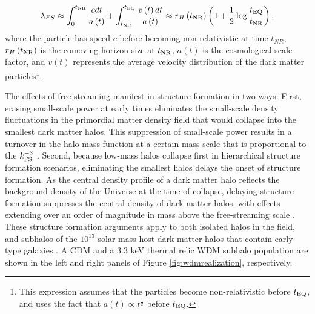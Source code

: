 \begin{equation}
\label{eqn:freestreaming}
\lambda_{FS} \approx \int_{0}^{t_{\rm{NR}}} \frac{c dt}{a\left(t\right)} +  \int_{t_{\rm{NR}}}^{t_{\rm{EQ}}} \frac{v\left(t\right) dt}{a\left(t\right)} \approx r_{H}\left(t_{\rm{NR}}\right) \left(1 +\frac{1}{2} \log \frac{t_{\rm{EQ}}}{t_{\rm{NR}}} \right),
\end{equation}
where the particle has speed $c$ before becoming non-relativistic at time $t_{NR}$, $r_H \left(t_{\rm{NR}}\right)$ is the comoving horizon size at $t_{\rm{NR}}$, $a\left(t\right)$ is the cosmological scale factor, and $v\left(t\right)$ represents the average velocity distribution of the dark matter particles\footnote{This expression assumes that the particles become non-relativistic before $t_{\rm{EQ}}$, and uses the fact that $a\left(t\right)\propto t^{\frac{1}{2}}$ before $t_{\rm{EQ}}$.}. 

The effects of free-streaming manifest in structure formation in two ways: First, erasing small-scale power at early times eliminates the small-scale density fluctuations in the primordial matter density field that would collapse into the smallest dark matter halos. This suppression of small-scale power results in a turnover in the halo mass function at a certain mass scale that is proportional to the $k_{\rm{FS}}^{-3}$ \cite{AvilaReese++01,Schneider++12,Lovell++14}. Second, because low-mass halos collapse first in hierarchical structure formation scenarios, eliminating the smallest halos delays the onset of structure formation. As the central density profile of a dark matter halo reflects the background density of the Universe at the time of collapse, delaying structure formation suppresses the central density of dark matter halos, with effects extending over an order of magnitude in mass above the free-streaming scale \cite{Navarro++96,Bose++16}. These structure formation arguments apply to both isolated halos in the field, and subhalos of the $10^{13}$ solar mass host dark matter halos that contain early-type galaxies \cite{Gavazzi++07}. A CDM and a 3.3 keV thermal relic WDM subhalo population are shown in the left and right panels of Figure \ref{fig:wdmrealization}, respectively. 

